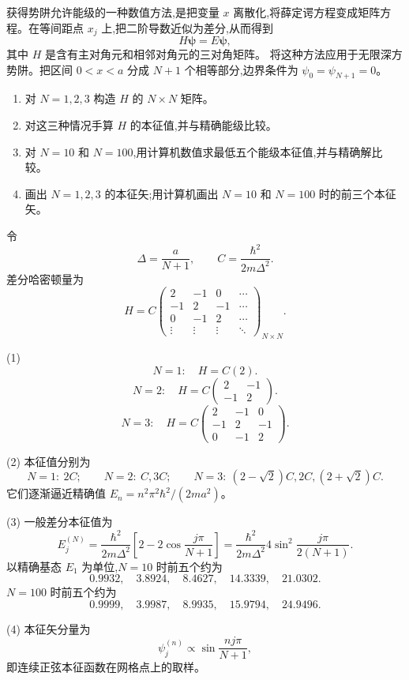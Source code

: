 \begin{question}
获得势阱允许能级的一种数值方法,是把变量 $x$ 离散化,将薛定谔方程变成矩阵方程。在等间距点 $x_j$ 上,把二阶导数近似为差分,从而得到
\[
H\mathbf{\psi}=E\mathbf{\psi},
\]
其中 $H$ 是含有主对角元和相邻对角元的三对角矩阵。
将这种方法应用于无限深方势阱。把区间 $0<x<a$ 分成 $N+1$ 个相等部分,边界条件为 $\psi_0=\psi_{N+1}=0$。
\begin{enumerate}
\item 对 $N=1,2,3$ 构造 $H$ 的 $N\times N$ 矩阵。
\item 对这三种情况手算 $H$ 的本征值,并与精确能级比较。
\item 对 $N=10$ 和 $N=100$,用计算机数值求最低五个能级本征值,并与精确解比较。
\item 画出 $N=1,2,3$ 的本征矢;用计算机画出 $N=10$ 和 $N=100$ 时的前三个本征矢。
\end{enumerate}
\end{question}
\begin{solution}
令
\[
\Delta=\frac{a}{N+1},
\qquad
C=\frac{\hbar^2}{2m\Delta^2}.
\]
差分哈密顿量为
\[
H=C\begin{pmatrix}
2&-1&0&\cdots\\
-1&2&-1&\cdots\\
0&-1&2&\cdots\\
\vdots&\vdots&\vdots&\ddots
\end{pmatrix}_{N\times N}.
\]

(1) 
\[
N=1:\quad H=C(2).
\]
\[
N=2:\quad H=C\begin{pmatrix}2&-1\\-1&2\end{pmatrix}.
\]
\[
N=3:\quad H=C\begin{pmatrix}2&-1&0\\-1&2&-1\\0&-1&2\end{pmatrix}.
\]

(2) 本征值分别为
\[
N=1:\ 2C;
\qquad
N=2:\ C,3C;
\qquad
N=3:\ (2-\sqrt2)C,2C,(2+\sqrt2)C.
\]
它们逐渐逼近精确值 $E_n=n^2\pi^2\hbar^2/(2ma^2)$。

(3) 一般差分本征值为
\[
E_j^{(N)}=\frac{\hbar^2}{2m\Delta^2}
\left[2-2\cos\frac{j\pi}{N+1}\right]
=\frac{\hbar^2}{2m\Delta^2}4\sin^2\frac{j\pi}{2(N+1)}.
\]
以精确基态 $E_1$ 为单位,$N=10$ 时前五个约为
\[
0.9932,
\quad 3.8924,
\quad 8.4627,
\quad 14.3339,
\quad 21.0302.
\]
$N=100$ 时前五个约为
\[
0.9999,
\quad 3.9987,
\quad 8.9935,
\quad 15.9794,
\quad 24.9496.
\]

(4) 本征矢分量为
\[
\psi_j^{(n)}\propto \sin\frac{nj\pi}{N+1},
\]
即连续正弦本征函数在网格点上的取样。
\end{solution}

